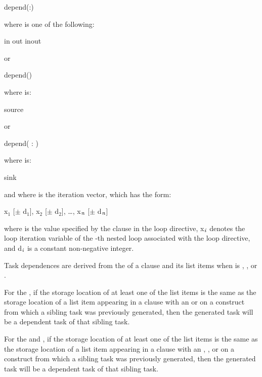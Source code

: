 {{{{\begin{boxedcode}
depend(:)
\end{boxedcode}

where  is one of the following:
\begin{indentedcodelist}
in
out
inout
\end{indentedcodelist}

or

\begin{boxedcode}
depend()
\end{boxedcode}

where  is:
\begin{indentedcodelist}
source
\end{indentedcodelist}

or

\begin{boxedcode}
depend( : )
\end{boxedcode}

where  is:
\begin{indentedcodelist}
sink
\end{indentedcodelist}

and where  is the iteration vector, which has the form:

x$_{1}$ [$\pm $ d$_{1}$], x$_{2}$ [$\pm $ d$_{2}$], \ldots, x$_{{\textrm{\textmd{\itshape{n}}}}}$ [$\pm $ d$_{{\textrm{\textmd{\itshape{n}}}}}$]

where  is the value specified by the  clause in the loop
directive, x$_{{\textrm{\textmd{\itshape{i}}}}}$ denotes the loop iteration variable of the -th
nested loop associated with the loop directive, and d$_{{\textrm{\textmd{\itshape{i}}}}}$ is a
constant non-negative integer.

\descr
Task dependences are derived from the  of a  clause and its list 
items when  is , , or .

For the  , if the storage location of at least one
of the list items is the same as the storage location of a list item appearing
in a  clause with an  or   on a construct
from which a sibling task was previously generated, then the generated task
will be a dependent task of that sibling task.

For the  and  , if the storage location of at least one
of the list items is the same as the storage location of a list item appearing
in a  clause with an , , or   on
a construct from which a sibling task was previously generated, then the
generated task will be a dependent task of that sibling task.

}}}}
